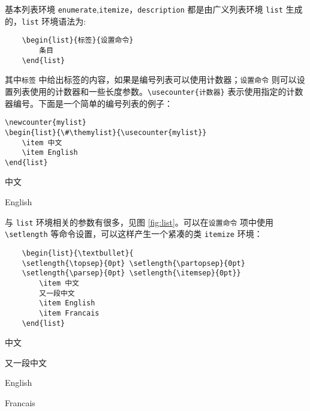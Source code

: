 基本列表环境 \verb|enumerate|,\verb|itemize|，\verb|description| 都是由广义列表环境 \verb|list| 生成的，\verb|list| 环境语法为:

\begin{lstlisting}
    \begin{list}{标签}{设置命令}
        条目
    \end{list}
\end{lstlisting}

其中\verb|标签| 中给出标签的内容，如果是编号列表可以使用计数器；\verb|设置命令| 则可以设置列表使用的计数器和一些长度参数。\verb|\usecounter{计数器}| 表示使用指定的计数
器编号。下面是一个简单的编号列表的例子：

\begin{minipage}[t]{0.45\textwidth}
\begin{lstlisting}
\newcounter{mylist}
\begin{list}{\#\themylist}{\usecounter{mylist}}
    \item 中文
    \item English
\end{list}
\end{lstlisting}
\end{minipage}
\hfill
\begin{minipage}[t]{0.45\textwidth}
    \begin{list}{\#\themylist}{}
        \item 中文
        \item English
    \end{list}
\end{minipage}

与 \verb|list| 环境相关的参数有很多，见图 \ref{fig:list}。可以在\verb|设置命令| 项中使用\verb|\setlength| 等命令设置，可以这样产生一个紧凑的类 \verb|itemize| 环境：

\begin{lstlisting}
    \begin{list}{\textbullet}{
    \setlength{\topsep}{0pt} \setlength{\partopsep}{0pt}
    \setlength{\parsep}{0pt} \setlength{\itemsep}{0pt}}
        \item 中文
        又一段中文
        \item English
        \item Francais
    \end{list}
\end{lstlisting}

\begin{list}{\textbullet}{
    \setlength{\topsep}{0pt} \setlength{\partopsep}{0pt}
    \setlength{\parsep}{0pt} \setlength{\itemsep}{0pt}}
        \item 中文
        
        又一段中文
        \item English
        \item Francais
\end{list}

